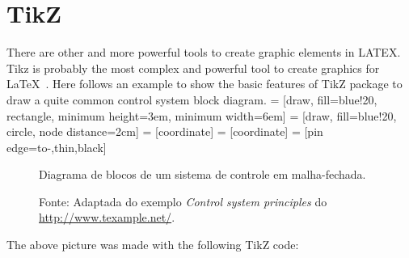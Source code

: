 \section{TikZ}
There are other and more powerful tools to create graphic elements in LATEX. Tikz is probably the most complex and powerful tool to create graphics for \LaTeX\ . Here follows an example to show the basic features of TikZ package to draw a quite common control system block diagram.
 = [draw, fill=blue!20, rectangle, 
    minimum height=3em, minimum width=6em]
 = [draw, fill=blue!20, circle, node distance=2cm]
 = [coordinate]
 = [coordinate]
 = [pin edge={to-,thin,black}]
\begin{figure}[!ht]
\caption{Diagrama de blocos de um sistema de controle em malha-fechada.}
\centering
\caption*{Fonte: Adaptada do exemplo {\it Control system principles}  do \url{http://www.texample.net/}.}
\end{figure}
The above picture was made with the following TikZ code:

